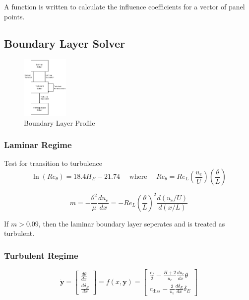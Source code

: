 \documentclass{article}
\begin{document}
A function is written to calculate the influence coefficients for a vector of panel points.


\subsection{Boundary Layer Solver}

\begin{figure}[H]
    \centering
    \includegraphics[width=0.2\textwidth]{figures/bl_solver_flowchart.png}
    \caption{Boundary Layer Profile}
    \label{fig:BL}
\end{figure}

\subsubsection{Laminar Regime}

Test for transition to turbulence
\begin{equation}
    \ln(Re_\theta) = 18.4 H_E - 21.74 \quad \text{ where } \quad Re_\theta = Re_L\left( \frac{u_e}{U} \right) \left( \frac{\theta}{L} \right)
\end{equation}

\begin{equation}
    m = - \frac{\theta^2}{\mu}\frac{du_e}{dx} = -Re_L \left( \frac{\theta}{L} \right)^2 \frac{d(u_e / U)}{d(x/L)}
\end{equation}

If $m > 0.09$, then the laminar boundary layer seperates and is treated as turbulent.

\subsubsection{Turbulent Regime}

\begin{equation}
    \dot{\mathbf{y}} = \begin{bmatrix}
        \frac{d \theta}{d x} \\[5pt]
        \frac{d \delta_E}{d x}
    \end{bmatrix} = f(x,\mathbf{y}) = \begin{bmatrix}
        \frac{c_f}{2} - \frac{H+2}{u_e}\frac{d u_e}{d x} \theta \\[5pt]
        c_\text{diss} - \frac{3}{u_e} \frac{d \delta_E}{d x} \delta_E
    \end{bmatrix}
\end{equation}
\end{document}
